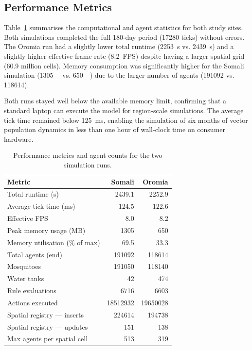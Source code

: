\documentclass{article}
\begin{document}
\subsection{Performance Metrics}

Table~\ref{tab:performance} summarises the computational and agent statistics for both study sites. Both simulations completed the 
full 180-day period (\num{17280} ticks) without errors. The Oromia run had a slightly lower total runtime (\qty{2253}{\second} 
vs. \qty{2439}{\second}) and a slightly higher effective frame rate (8.2~FPS) despite having a larger spatial grid 
(\num{60.9} million cells). Memory consumption was significantly higher for the Somali simulation 
(\qty{1305}{\mega\byte} vs. \qty{650}{\mega\byte}) due to the larger number of agents (\num{191092} vs. \num{118614}).

Both runs stayed well below the available memory limit, confirming that a standard laptop can execute the model for 
region-scale simulations. The average tick time remained below \qty{125}{\milli\second}, enabling the simulation of six 
months of vector population dynamics in less than one hour of wall-clock time on consumer hardware.

\begin{table}[!htb]
\centering
\caption{Performance metrics and agent counts for the two simulation runs.}
\label{tab:performance}
\begin{tabular}{l r r}
\toprule
Metric & {Somali} & {Oromia} \\ 
\midrule
Total runtime (s)               & 2439.1 & 2252.9 \\
Average tick time (ms)          & 124.5 & 122.6 \\
Effective FPS                   & 8.0 & 8.2 \\
Peak memory usage (MB)          & 1305 & 650 \\
Memory utilisation (\% of max)  & 69.5 & 33.3 \\
Total agents (end)              & 191092 & 118614 \\
\quad Mosquitoes                & 191050 & 118140 \\
\quad Water tanks               & 42 & 474 \\
Rule evaluations                & 6716 & 6603 \\
Actions executed                & 18512932 & 19650028 \\
Spatial registry --- inserts    & 224614 & 194738 \\
Spatial registry --- updates    & 151 & 138 \\
Max agents per spatial cell     & 513 & 319 \\ 
\bottomrule
\end{tabular}
\end{table}
\end{document}
